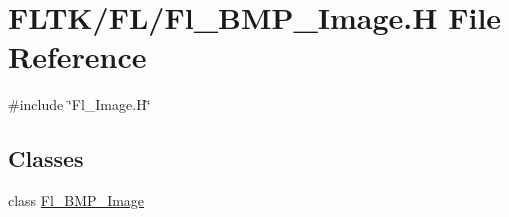 \hypertarget{_fl___b_m_p___image_8_h}{}\section{F\+L\+T\+K/\+F\+L/\+Fl\+\_\+\+B\+M\+P\+\_\+\+Image.H File Reference}
\label{_fl___b_m_p___image_8_h}
{\ttfamily \#include \char`\"{}Fl\+\_\+\+Image.\+H\char`\"{}}\newline
\subsection*{Classes}
\begin{DoxyCompactItemize}
\item 
class \hyperlink{class_fl___b_m_p___image}{Fl\+\_\+\+B\+M\+P\+\_\+\+Image}
\end{DoxyCompactItemize}
